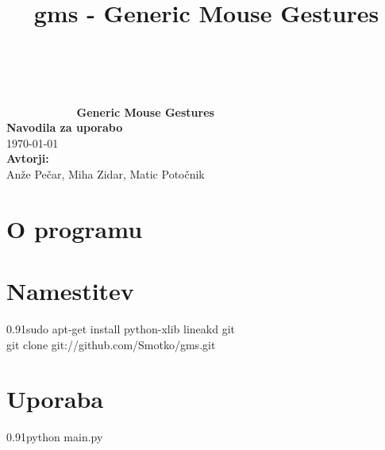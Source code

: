 \documentclass[10pt,a4paper,oneside]{article}
\title{gms - Generic Mouse Gestures}
\newcommand\inliney[1]{%
\begin{Sbox}\begin{varwidth}{0.91\textwidth}{#1}\end{varwidth}\end{Sbox}%
\colorbox{lightgray}{\TheSbox}%
}
\begin{document}
\begin{titlepage}
\begin{center}
\ \\[3cm]
{}\\[-40pt]
{\huge\bf \ \ \ \ \ \ \ \ \ \ \ Generic Mouse Gestures}\\[5cm]
{\huge\bf Navodila za uporabo}\ \\[0.35cm]
{\Large \today}\ \\[3cm]
{\huge {\bf Avtorji:}}\\[0.35cm]
{\Large Anže Pečar, Miha Zidar, Matic Potočnik}
\vfill
\parbox{7.5cm}{
\begin{center}
\end{center}
}
\end{center}
\end{titlepage}
\tableofcontents
\pagebreak

\section{O programu}
\section{Namestitev}
\inliney{sudo apt-get install python-xlib lineakd git\\
git clone git://github.com/Smotko/gms.git}

\section{Uporaba}
\inliney{python main.py}
\end{document}
